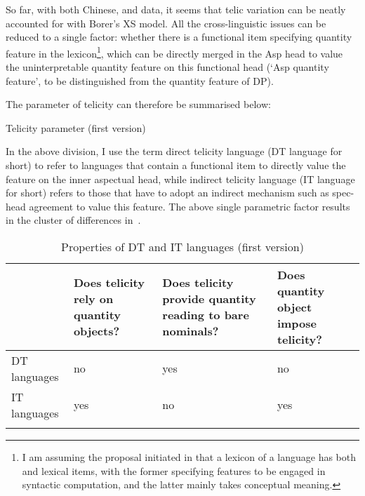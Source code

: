\documentclass[output=paper]{langsci/langscibook}
\begin{document}
So far, with both Chinese,  and  data, it seems that
telic variation can be neatly accounted for with Borer's XS model. All the
cross-linguistic issues can be reduced to a single factor: whether there is a
functional item specifying quantity feature in the lexicon\footnote{I am
    assuming the proposal initiated in 
    \citep[cf.][]{HalleMarantz1993,marantz2007phases} that a lexicon of a
    language has both  and lexical items, with the former
    specifying features to be engaged in syntactic computation, and the latter
mainly takes conceptual meaning.}, which can be directly merged in the
Asp head to value the uninterpretable quantity feature on this
functional head (`Asp quantity feature', to be
distinguished from the quantity feature of DP).

The parameter of telicity can therefore be summarised below:

\begin{exe}\ex Telicity parameter (first version)\smallskip\\
\end{exe}

In the above division, I use the term direct telicity language
(\gls{DT} language for short) to refer to languages that contain a
functional item to directly value the feature on the inner aspectual head,
while indirect telicity language (\gls{IT} language for short)
refers to those that have to adopt an indirect mechanism such as spec-head
agreement to value this feature. The above single parametric factor results in
the cluster of differences in~.

\begin{table}
\caption{Properties of DT and IT languages (first version)}\label{table:1}
\begin{tabularx}{1\textwidth}{lQQQ}
\lsptoprule
{} & Does telicity rely on quantity objects? & Does telicity provide quantity reading to bare nominals? & Does quantity object impose telicity? \\
\midrule
DT languages\footnotemark & no  & yes & no\\
IT languages\footnotemark & yes & no & yes\\
\lspbottomrule
\end{tabularx}
\end{table}
\end{document}
